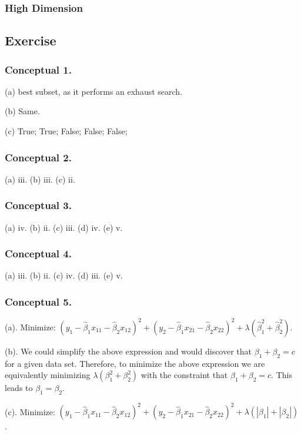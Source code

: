 \subsubsection{High Dimension}
\subsection{Exercise}
\subsubsection{Conceptual 1.}
(a) best subset, as it performs an exhaust search. 

(b) Same.

(c) True; True; False; False; False;
\subsubsection{Conceptual 2.}
(a) iii.
(b) iii.
(c) ii.
\subsubsection{Conceptual 3.}
(a) iv.
(b) ii.
(c) iii.
(d) iv.
(e) v.
\subsubsection{Conceptual 4.}
(a) iii.
(b) ii.
(c) iv.
(d) iii.
(e) v.
\subsubsection{Conceptual 5.}
(a). Minimize: $(y_1 - \hat{\beta}_1x_{11} - \hat{\beta}_2x_{12})^2 + (y_2 - \hat{\beta}_1x_{21} - \hat{\beta}_2x_{22})^2 + \lambda (\hat{\beta}_1^2 + \hat{\beta}_2^2)$.

(b). We could simplify the above expression and would discover that $\beta_1 + \beta_2 = c$ for a given data set. Therefore, to minimize the above expression we are equivalently minimizing $\lambda(\beta_1^2 + \beta_2^2)$ with the constraint that $\beta_1 + \beta_2 = c$. This leads to $\beta_1 = \beta_2$.

(c). Minimize: $(y_1 - \hat{\beta}_1x_{11} - \hat{\beta}_2x_{12})^2 + (y_2 - \hat{\beta}_1x_{21} - \hat{\beta}_2x_{22})^2 + \lambda(|\beta_1| + |\beta_2|)$.

